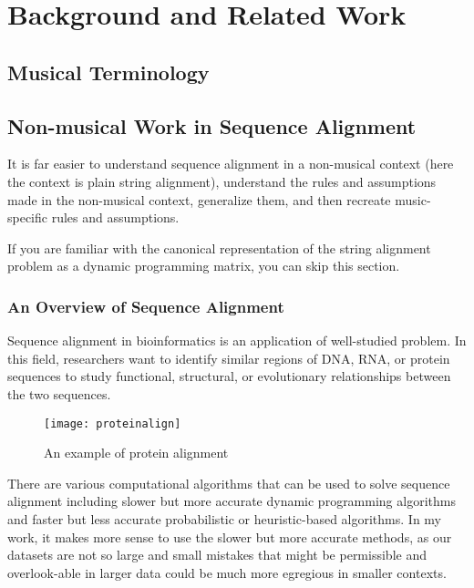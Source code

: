 \chapter{Background and Related Work}
\section{Musical Terminology}
\section{Non-musical Work in Sequence Alignment}
It is far easier to understand sequence alignment in a non-musical context (here the context is plain string alignment), understand the rules and assumptions made in the non-musical context, generalize them, and then recreate music-specific rules and assumptions. 

If you are familiar with the canonical representation of the string alignment problem as a dynamic programming matrix, you can skip this section. 

\subsection{An Overview of Sequence Alignment}
Sequence alignment in bioinformatics is an application of well-studied problem. In this field, researchers want to identify similar regions of DNA, RNA, or protein sequences to study functional, structural, or evolutionary relationships between the two sequences.

\begin{figure}[!ht]

\centering
\texttt{[image: proteinalign]}
\caption{An example of protein alignment \cite{proteins}}
\end{figure}

There are various computational algorithms that can be used to solve sequence alignment including slower but more accurate dynamic programming algorithms and faster but less accurate probabilistic or heuristic-based algorithms. In my work, it makes more sense to use the slower but more accurate methods, as our datasets are not so large and small mistakes that might be permissible and overlook-able in larger data could be much more egregious in smaller contexts.

